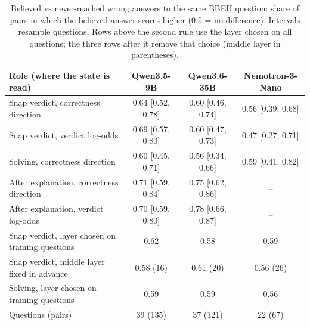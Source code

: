 \documentclass[11pt]{article}
\begin{document}
\begin{table}[t]
\centering
\small
\setlength{\tabcolsep}{4pt}
\begin{tabular}{lccc}
\toprule
Role (where the state is read) & Qwen3.5-9B & Qwen3.6-35B & Nemotron-3-Nano \\
\midrule
Snap verdict, correctness direction & 0.64 {\scriptsize[0.52, 0.78]} & 0.60 {\scriptsize[0.46, 0.74]} & 0.56 {\scriptsize[0.39, 0.68]} \\
Snap verdict, verdict log-odds & 0.69 {\scriptsize[0.57, 0.80]} & 0.60 {\scriptsize[0.47, 0.73]} & 0.47 {\scriptsize[0.27, 0.71]} \\
Solving, correctness direction & 0.60 {\scriptsize[0.45, 0.71]} & 0.56 {\scriptsize[0.34, 0.66]} & 0.59 {\scriptsize[0.41, 0.82]} \\
After explanation, correctness direction & 0.71 {\scriptsize[0.59, 0.84]} & 0.75 {\scriptsize[0.62, 0.86]} & -- \\
After explanation, verdict log-odds & 0.70 {\scriptsize[0.59, 0.80]} & 0.78 {\scriptsize[0.66, 0.87]} & -- \\
\midrule
Snap verdict, layer chosen on training questions & 0.62 & 0.58 & 0.59 \\
Snap verdict, middle layer fixed in advance & 0.58 (16) & 0.61 (20) & 0.56 (26) \\
Solving, layer chosen on training questions & 0.59 & 0.59 & 0.56 \\
\midrule
Questions (pairs) & 39 (135) & 37 (121) & 22 (67) \\
\bottomrule
\end{tabular}
\caption{Believed vs never-reached wrong answers to the same BBEH question: share of pairs in which the believed
answer scores higher (0.5 = no difference). Intervals resample questions. Rows above the second rule use the layer
chosen on all questions; the three rows after it remove that choice (middle layer in parentheses).}
\label{tab:inside}
\end{table}
\end{document}
